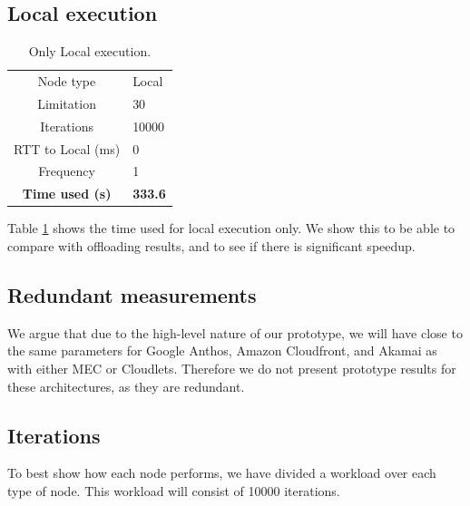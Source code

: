 
\subsection{Local execution}
\begin{table}[h!]
    \centering
    \begin{tabular}[c]{c|p{2cm}}

        Node type & Local \\

        Limitation          & 30  \\

        Iterations          & 10000  \\

        RTT to Local (ms)   & 0  \\

        Frequency           & 1 \\

        \hline
        \textbf{Time used (s)} & \textbf{333.6} \\

    \end{tabular}
    \caption{Only Local execution.}
    \label{tab:local_execution}
\end{table}
Table \ref{tab:local_execution} shows the time used for local execution only. We show this to be able to compare with offloading results, and to see if there is significant speedup.

\subsection{Redundant measurements}
We argue that due to the high-level nature of our prototype, we will have close to the same parameters for Google Anthos, Amazon Cloudfront, and Akamai as with either MEC or Cloudlets. Therefore we do not present prototype results for these architectures, as they are redundant.

\subsection{Iterations}
To best show how each node performs, we have divided a workload over each type of node. This workload will consist of 10000 iterations.









